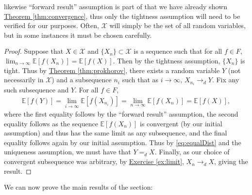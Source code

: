 \documentclass{article}
\theoremstyle{definition}
\newcommand{\E}{\mathbb E}
\newcommand{\1}{\mathbb I}
\newcommand{\thmhref}[1]{\hyperref[#1]{Theorem \ref{#1}}}
\newcommand{\exerhref}[1]{\hyperref[#1]{Exercise \ref{#1}}}
\begin{document}
likewise ``forward result'' assumption is part of that we have already
shown \thmhref{thm:convergence}, thus only the tightness assumption
will need to be verified for our purposes.  Often, $\mathcal X$ will
simply be the set of all random variables, but in some instances it
must be chosen carefully.
\begin{proof}
  Suppose that $X \in \mathcal X$ and $\{X_n\} \subset \mathcal X$ is
  a sequence such that for all $f \in F$, $\lim_{n \to \infty}
  \E[f(X_n)] = \E[f(X)]$.  Then by the tightness assumption, $\{X_n\}$
  is tight.  Thus by \thmhref{thm:prokhorov}, there exists a random
  variable $Y$ (not necessarily in $\mathcal X$) and a subsequence
  $n_i$ such that as $i \to \infty$, $X_{n_i} \to_d Y$.  Fix any such
  subsequence and $Y$.  For all $f \in F$,
  \begin{align}
    \label{eq:equalDist}
    \E[f(Y)] =  \lim_{i \to \infty}
    \E[f(X_{n_i})] = \lim_{n \to \infty} \E[f(X_n)] = \E[f(X)],
  \end{align}
  where the first equality follows by the ``forward result'' assumption, the second
  equality follows as the sequence $\E[f(X_n)]$ is convergent (by our initial
  assumption) and thus has the same limit as any subsequence, and
  the final equality follows again by our initial assumption.  Thus by
  \eqref{eq:equalDist} and the uniqueness assumption, we must have that $Y =_d
  X$.  Finally, as our choice of convergent
  subsequence was arbitrary, by \exerhref{ex:limit}, $X_{n} \to_d X$,
  giving the result.
\end{proof}
We can now prove the main results of the section:
\end{document}
